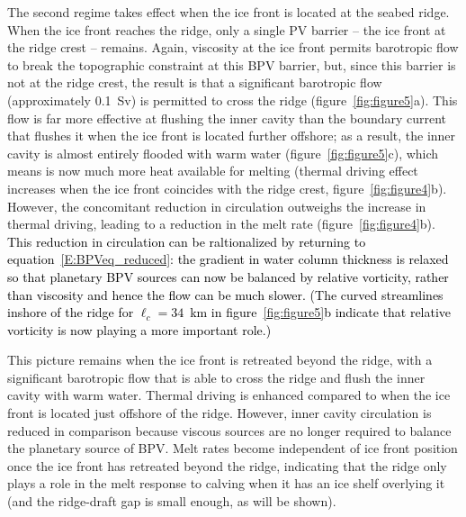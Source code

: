 \documentclass[draft]{agujournal2019}
\newcommand{\blue}[1]{\textcolor{blue}{#1}}
\renewcommand{\blue}[1]{{\textcolor{black}{#1}}} %
\begin{document}
The second regime takes effect when the ice front is located at the seabed ridge. When the ice front reaches the ridge, only a single PV barrier -- the ice front at the ridge crest -- remains. Again, viscosity at the ice front permits barotropic flow to break the topographic constraint at this BPV barrier, but, since this barrier is not at the ridge crest, the result is that a significant barotropic flow (approximately 0.1~Sv) is permitted to cross the ridge (figure~\ref{fig:figure5}a). This flow is far more effective at flushing the inner cavity than the boundary current that flushes it when the ice front is located further offshore; as a result, the inner cavity is almost entirely flooded with warm water (figure~\ref{fig:figure5}c), which means is now much more heat available for melting (thermal driving effect increases when the ice front coincides with the ridge crest, figure~\ref{fig:figure4}b). However, the concomitant reduction in circulation outweighs the increase in thermal driving, leading to a reduction in the melt rate (figure~\ref{fig:figure4}b). \blue{This reduction in circulation can be raltionalized by returning to equation~\eqref{E:BPVeq_reduced}: the gradient in water column thickness is relaxed so that planetary BPV sources can now be balanced by relative vorticity, rather than viscosity and hence the flow can be much slower. (The curved streamlines inshore of the ridge for $\ell_c = 34$~km in figure~\ref{fig:figure5}b indicate that relative vorticity is now playing a more important role.)}

This picture remains when the ice front is retreated beyond the ridge, with a significant barotropic flow that is able to cross the ridge and flush the inner cavity with warm water. Thermal driving is enhanced compared to when the ice front is located just offshore of the ridge. However, inner cavity circulation is reduced in comparison because viscous sources are no longer required to balance the planetary source of BPV. Melt rates become independent of ice front position once the ice front has retreated beyond the ridge, indicating that the ridge only plays a role in the melt response to calving when it has an ice shelf overlying it (and the ridge-draft gap is small enough, as will be shown).
\end{document}
